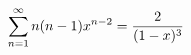 \documentclass[preview]{standalone}
\begin{document}
\begin{align*}
\special{dvisvgm:raw <g id='unique000'>}\displaystyle\sum_{n=1}^{\infty}n(n-1)x^{n-2}=\dfrac{2}{(1-x)^3}\special{dvisvgm:raw </g>}
\end{align*}
\end{document}
